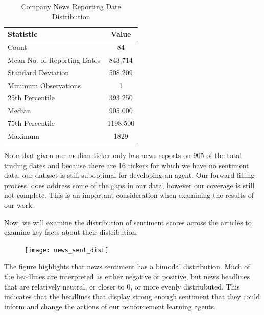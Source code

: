 \begin{table}[htbp]
    \centering
    \caption{Company News Reporting Date Distribution}
    \begin{tabular}{l c}
        \toprule
        \textbf{Statistic} & \textbf{Value} \\
        \midrule
        Count & 84 \\
        Mean No. of Reporting Dates & 843.714 \\
        Standard Deviation & 508.209 \\
        Minimum Observations & 1 \\
        25th Percentile & 393.250 \\
        Median & 905.000 \\
        75th Percentile & 1198.500 \\
        Maximum & 1829 \\
        \bottomrule
    \end{tabular}
\end{table}

Note that given our median ticker only has news reports on 905 of the total trading dates and because there are 16 tickers for which we have no sentiment data, our dataset is still suboptimal for developing an agent. Our forward filling process, does address some of the gaps in our data, however our coverage is still not complete.
This is an important consideration when examining the results of our work.

Now, we will examine the distribution of sentiment scores across the articles to examine key facts about their distribution.


\begin{figure}
\texttt{[image: news\_sent\_dist]}
\end{figure}

The figure highlights that news sentiment has a bimodal distribution. Much of the headlines are interpreted as either negative or positive, but news headlines that are relatively neutral, or closer to 0, or more evenly distriubuted. 
This indicates that the headlines that display strong enough sentiment that they could inform and change the actions of our reinforcement learning agents.

